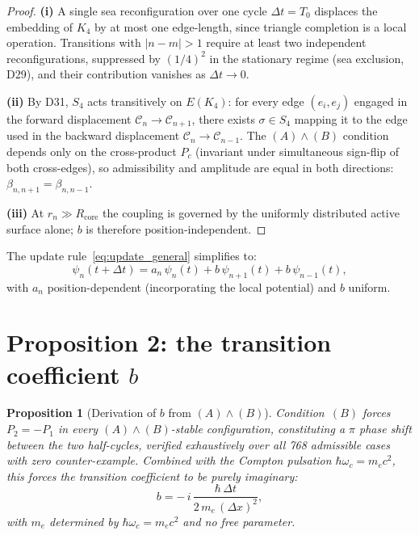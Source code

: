 \documentclass[11pt,a4paper]{article}
\newtheorem{proposition}[theorem]{Proposition}
\theoremstyle{definition}
\newcommand{\hb}{\hbar}
\begin{document}
\begin{proof}
\textbf{(i)} A single sea reconfiguration over one cycle $\Delta t = T_0$ displaces the embedding of $K_4$ by at most one edge-length, since triangle completion is a local operation. Transitions with $|n-m|>1$ require at least two independent reconfigurations, suppressed by $(1/4)^2$ in the stationary regime (sea exclusion, D29), and their contribution vanishes as $\Delta t\to 0$.

\textbf{(ii)} By D31, $S_4$ acts transitively on $E(K_4)$: for every edge $(e_i,e_j)$ engaged in the forward displacement $\mathcal{C}_n\to\mathcal{C}_{n+1}$, there exists $\sigma\in S_4$ mapping it to the edge used in the backward displacement $\mathcal{C}_n\to\mathcal{C}_{n-1}$. The $(A)\wedge(B)$ condition depends only on the cross-product $P_c$ (invariant under simultaneous sign-flip of both cross-edges), so admissibility and amplitude are equal in both directions: $\beta_{n,n+1} = \beta_{n,n-1}$.

\textbf{(iii)} At $r_n \gg R_{\mathrm{core}}$ the coupling is governed by the uniformly distributed active surface alone; $b$ is therefore position-independent.
\end{proof}

The update rule~\eqref{eq:update_general} simplifies to:
\begin{equation}
\psi_n(t+\Delta t) = a_n\,\psi_n(t) + b\,\psi_{n+1}(t) + b\,\psi_{n-1}(t),
\label{eq:update}
\end{equation}
with $a_n$ position-dependent (incorporating the local potential) and $b$ uniform.

\section{Proposition 2: the transition coefficient \texorpdfstring{$b$}{b}}
\label{sec:P2}

\begin{proposition}[Derivation of $b$ from $(A)\wedge(B)$]
\label{prop:P2}
Condition~$(B)$ forces $P_2 = -P_1$ in every $(A)\wedge(B)$-stable configuration, constituting a $\pi$ phase shift between the two half-cycles, verified exhaustively over all 768 admissible cases with zero counter-example. Combined with the Compton pulsation $\hb\omega_c = m_e c^2$, this forces the transition coefficient to be purely imaginary:
\begin{equation}
b = -\,i\,\frac{\hb\,\Delta t}{2\,m_e\,(\Delta x)^2},
\label{eq:b}
\end{equation}
with $m_e$ determined by $\hb\omega_c = m_e c^2$ and no free parameter.
\end{proposition}
\end{document}
